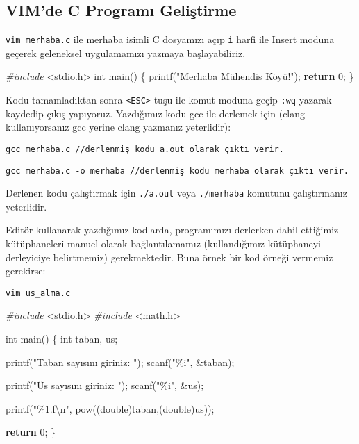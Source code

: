 \documentclass[
]{book}
\newenvironment{Shaded}{\begin{snugshade}}{\end{snugshade}}
\newcommand{\ControlFlowTok}[1]{\textcolor[rgb]{0.13,0.29,0.53}{\textbf{#1}}}
\newcommand{\DataTypeTok}[1]{\textcolor[rgb]{0.13,0.29,0.53}{#1}}
\newcommand{\DecValTok}[1]{\textcolor[rgb]{0.00,0.00,0.81}{#1}}
\newcommand{\ImportTok}[1]{#1}
\newcommand{\NormalTok}[1]{#1}
\newcommand{\PreprocessorTok}[1]{\textcolor[rgb]{0.56,0.35,0.01}{\textit{#1}}}
\newcommand{\SpecialCharTok}[1]{\textcolor[rgb]{0.00,0.00,0.00}{#1}}
\newcommand{\StringTok}[1]{\textcolor[rgb]{0.31,0.60,0.02}{#1}}
\begin{document}
\hypertarget{vimde-c-programux131-geliux15ftirme}{%
\subsection*{VIM'de C Programı Geliştirme}\label{vimde-c-programux131-geliux15ftirme}}

\texttt{vim\ merhaba.c} ile merhaba isimli C dosyamızı açıp \texttt{i} harfi ile Insert moduna geçerek geleneksel uygulamamızı yazmaya başlayabiliriz.

\begin{Shaded}
\begin{Highlighting}[]
\PreprocessorTok{\#include }\ImportTok{<stdio.h>}
\DataTypeTok{int}\NormalTok{ main()}
\NormalTok{\{}
\NormalTok{  printf(}\StringTok{"Merhaba Mühendis Köyü!"}\NormalTok{);}
  \ControlFlowTok{return} \DecValTok{0}\NormalTok{;}
\NormalTok{\}}
\end{Highlighting}
\end{Shaded}

Kodu tamamladıktan sonra \texttt{\textless{}ESC\textgreater{}} tuşu ile komut moduna geçip \texttt{:wq} yazarak kaydedip çıkış yapıyoruz. Yazdığımız kodu gcc ile derlemek için (clang kullanıyorsanız gcc yerine clang yazmanız yeterlidir):

\texttt{gcc\ merhaba.c\ //derlenmiş\ kodu\ a.out\ olarak\ çıktı\ verir.}

\texttt{gcc\ merhaba.c\ -o\ merhaba\ //derlenmiş\ kodu\ merhaba\ olarak\ çıktı\ verir.}

Derlenen kodu çalıştırmak için \texttt{./a.out} veya \texttt{./merhaba} komutunu çalıştırmanız yeterlidir.

Editör kullanarak yazdığımız kodlarda, programımızı derlerken dahil ettiğimiz kütüphaneleri manuel olarak bağlantılamamız (kullandığımız kütüphaneyi derleyiciye belirtmemiz) gerekmektedir. Buna örnek bir kod örneği vermemiz gerekirse:

\texttt{vim\ us\_alma.c}

\begin{Shaded}
\begin{Highlighting}[]
\PreprocessorTok{\#include }\ImportTok{<stdio.h>}
\PreprocessorTok{\#include }\ImportTok{<math.h>}

\DataTypeTok{int}\NormalTok{ main()}
\NormalTok{\{}
    \DataTypeTok{int}\NormalTok{ taban, us; }
  
\NormalTok{    printf(}\StringTok{"Taban sayısını giriniz: "}\NormalTok{);}
\NormalTok{    scanf(}\StringTok{"\%i"}\NormalTok{, \&taban);}
  
\NormalTok{    printf(}\StringTok{"Üs sayısını giriniz: "}\NormalTok{);}
\NormalTok{    scanf(}\StringTok{"\%i"}\NormalTok{, \&us);}

\NormalTok{    printf(}\StringTok{"\%1.f}\SpecialCharTok{\textbackslash{}n}\StringTok{"}\NormalTok{, pow((}\DataTypeTok{double}\NormalTok{)taban,(}\DataTypeTok{double}\NormalTok{)us));}

    \ControlFlowTok{return} \DecValTok{0}\NormalTok{;}
\NormalTok{\}}
\end{Highlighting}
\end{Shaded}
\end{document}

